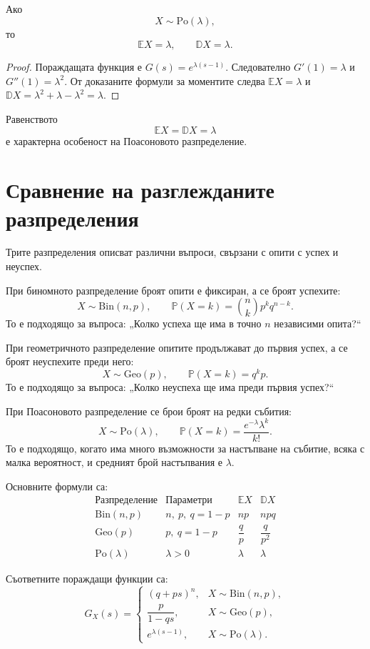 \begin{keythm}
Ако
\[
X\sim\mathrm{Po}(\lambda),
\]
то
\[
\mathbb{E}X=\lambda,
\qquad
\mathbb{D}X=\lambda.
\]
\end{keythm}

\begin{proof}
Пораждащата функция е $G(s)=e^{\lambda(s-1)}$. Следователно $G'(1)=\lambda$ и $G''(1)=\lambda^2$. От доказаните формули за моментите следва $\mathbb E X=\lambda$ и $\mathbb D X=\lambda^2+\lambda-\lambda^2=\lambda$.
\end{proof}

Равенството
\[
\mathbb{E}X=\mathbb{D}X=\lambda
\]
е характерна особеност на Поасоновото разпределение.

\section{Сравнение на разглежданите разпределения}\label{s:35.6}

Трите разпределения описват различни въпроси, свързани с опити с успех и неуспех.

При биномното разпределение броят опити е фиксиран, а се броят успехите:
\[
X\sim\mathrm{Bin}(n,p),
\qquad
\mathbb{P}(X=k)=\binom{n}{k}p^kq^{n-k}.
\]
То е подходящо за въпроса: „Колко успеха ще има в точно $n$ независими опита?“

При геометричното разпределение опитите продължават до първия успех, а се броят неуспехите преди него:
\[
X\sim\mathrm{Geo}(p),
\qquad
\mathbb{P}(X=k)=q^kp.
\]
То е подходящо за въпроса: „Колко неуспеха ще има преди първия успех?“

При Поасоновото разпределение се брои броят на редки събития:
\[
X\sim\mathrm{Po}(\lambda),
\qquad
\mathbb{P}(X=k)=\frac{e^{-\lambda}\lambda^k}{k!}.
\]
То е подходящо, когато има много възможности за настъпване на събитие, всяка с малка вероятност, и средният брой настъпвания е $\lambda$.

Основните формули са:
\[
\begin{array}{c|c|c|c}
\text{Разпределение} & \text{Параметри} & \mathbb{E}X & \mathbb{D}X\\
\hline
\mathrm{Bin}(n,p) & n,\ p,\ q=1-p & np & npq\\
\mathrm{Geo}(p) & p,\ q=1-p & \dfrac{q}{p} & \dfrac{q}{p^2}\\
\mathrm{Po}(\lambda) & \lambda>0 & \lambda & \lambda
\end{array}
\]

Съответните пораждащи функции са:
\[
G_X(s)=
\begin{cases}
(q+ps)^n, & X\sim\mathrm{Bin}(n,p),\\[4pt]
\dfrac{p}{1-qs}, & X\sim\mathrm{Geo}(p),\\[10pt]
e^{\lambda(s-1)}, & X\sim\mathrm{Po}(\lambda).
\end{cases}
\]

